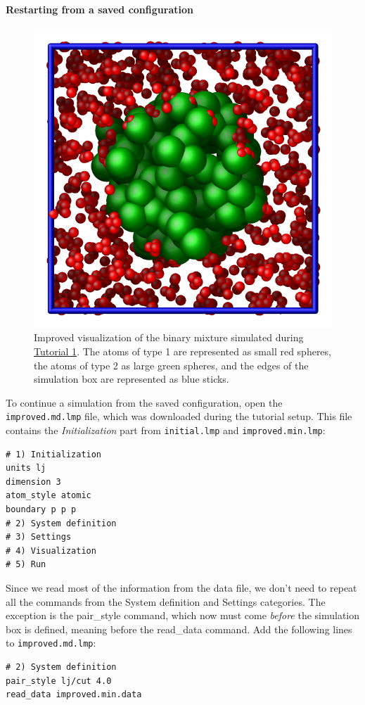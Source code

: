 \documentclass[9pt,tutorial]{livecoms}
\newcommand{\lmpcmd}[1]{\hspace{0pt}\colorbox{listing}{\textcolor{command}{\small{#1}}}\hspace{0pt}} %
\newcommand{\flecmd}[1]{\textcolor{command}{\texttt{#1}}} %
\begin{document}
\paragraph{Restarting from a saved configuration}

\begin{figure}
\centering
\includegraphics[width=0.55\linewidth]{LJ-cylinder}
\caption{Improved visualization of the binary mixture simulated
during \hyperref[lennard-jones-label]{Tutorial 1}.  The atoms of type 1 are
represented as small red spheres, the atoms of type 2 as large green spheres,
and the edges of the simulation box are represented as blue sticks.}
\label{fig:improved-min}
\end{figure}

To continue a simulation from the saved configuration, open the
\flecmd{improved.md.lmp} file, which was downloaded during the tutorial setup.
This file contains the \textit{Initialization} part from \flecmd{initial.lmp}
and \flecmd{improved.min.lmp}:
\begin{lstlisting}
# 1) Initialization
units lj
dimension 3
atom_style atomic
boundary p p p
# 2) System definition
# 3) Settings
# 4) Visualization
# 5) Run
\end{lstlisting}
Since we read most of the information from the data file, we don't need
to repeat all the commands from the \lmpcmd{System definition}
and \lmpcmd{Settings} categories.  The exception is the \lmpcmd{pair\_style}
command, which now must come \emph{before} the simulation box is defined,
meaning before the \lmpcmd{read\_data} command.  Add the following
lines to \flecmd{improved.md.lmp}:
\begin{lstlisting}
# 2) System definition
pair_style lj/cut 4.0
read_data improved.min.data
\end{lstlisting}
\end{document}
